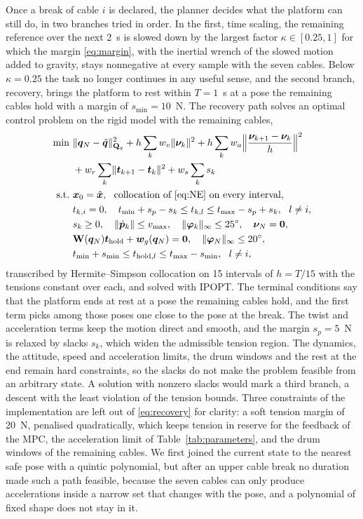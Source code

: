 \documentclass[a4paper,fleqn]{cas-dc}
\newcommand{\vc}[1]{\bm{#1}}
\newcommand{\mt}[1]{\mathbf{#1}}
\begin{document}
Once a break of cable $i$ is declared, the planner decides what the platform can still do, in two branches tried in order. In the first, time scaling, the remaining reference over the next 2~s is slowed down by the largest factor $\kappa\in[0.25,1]$ for which the margin \eqref{eq:margin}, with the inertial wrench of the slowed motion added to gravity, stays nonnegative at every sample with the seven cables. Below $\kappa=0.25$ the task no longer continues in any useful sense, and the second branch, recovery, brings the platform to rest within $T=1$~s at a pose the remaining cables hold with a margin of $s_{\min}=10$~N. The recovery path solves an optimal control problem on the rigid model with the remaining cables,
\begin{equation}\label{eq:recovery}
\begin{aligned}
\min\ &\lVert\vc q_N-\hat{\vc q}\rVert^2_{\mt Q_q}+h\sum_k w_v\lVert\vc\nu_k\rVert^2+h\sum_k w_a\Big\lVert\frac{\vc\nu_{k+1}-\vc\nu_k}{h}\Big\rVert^2\\
&+w_r\sum_k\lVert\vc t_{k+1}-\vc t_k\rVert^2+w_s\sum_k s_k\\
\text{s.t.}\ &\vc x_0=\hat{\vc x},\ \ \text{collocation of \eqref{eq:NE} on every interval},\\
&t_{k,i}=0,\quad t_{\min}+s_p-s_k\le t_{k,l}\le t_{\max}-s_p+s_k,\ \ l\ne i,\\
&s_k\ge0,\quad\lVert\dot{\vc p}_k\rVert\le v_{\max},\quad\lVert\vc\varphi_k\rVert_\infty\le25^\circ,\quad\vc\nu_N=\vc0,\\
&\mt W(\vc q_N)\vc t_{\mathrm{hold}}+\vc w_g(\vc q_N)=\vc 0,\quad\lVert\vc\varphi_N\rVert_\infty\le20^\circ,\\
&t_{\min}+s_{\min}\le t_{\mathrm{hold},l}\le t_{\max}-s_{\min},\ \ l\ne i,
\end{aligned}
\end{equation}
transcribed by Hermite--Simpson collocation \citep{kelly2017collocation} on 15 intervals of $h=T/15$ with the tensions constant over each, and solved with IPOPT. The terminal conditions say that the platform ends at rest at a pose the remaining cables hold, and the first term picks among those poses one close to the pose at the break. The twist and acceleration terms keep the motion direct and smooth, and the margin $s_p=5$~N is relaxed by slacks $s_k$, which widen the admissible tension region. The dynamics, the attitude, speed and acceleration limits, the drum windows and the rest at the end remain hard constraints, so the slacks do not make the problem feasible from an arbitrary state. A solution with nonzero slacks would mark a third branch, a descent with the least violation of the tension bounds. Three constraints of the implementation are left out of \eqref{eq:recovery} for clarity: a soft tension margin of 20~N, penalised quadratically, which keeps tension in reserve for the feedback of the MPC, the acceleration limit of Table~\ref{tab:parameters}, and the drum windows of the remaining cables. We first joined the current state to the nearest safe pose with a quintic polynomial, but after an upper cable break no duration made such a path feasible, because the seven cables can only produce accelerations inside a narrow set that changes with the pose, and a polynomial of fixed shape does not stay in it.
\end{document}
